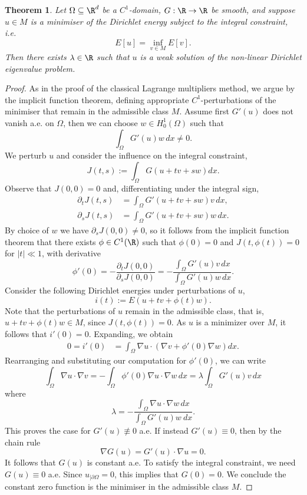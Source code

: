 \documentclass[reqno]{amsart}
\newtheorem{theorem}{Theorem}
\theoremstyle{definition}
\theoremstyle{remark}
\newcounter{problem}[section]	\declaretheorem[style=thmrecbox,name=Problem, numberlike=problem]{statement}
\begin{document}
\begin{theorem}
	Let $\Omega \subseteq \R^d$ be a $C^1$-domain, $G : \R \to \R$ be smooth, and suppose $u \in M$ is a minimiser of the Dirichlet energy subject to the integral constraint, i.e.
		\[ E[u] = \inf_{v \in M} E[v]. \] 
	Then there exists $\lambda \in \R$ such that $u$ is a weak solution of the non-linear Dirichlet eigenvalue problem. 
\end{theorem}	

\begin{proof}
	As in the proof of the classical Lagrange multipliers method, we argue by the implicit function theorem, defining appropriate $C^1$-perturbations of the minimiser that remain in the admissible class $M$. Assume first $G' (u)$ does not vanish a.e. on $\Omega$, then we can choose $w \in H_0^1 (\Omega)$ such that 
		\[ \int_\Omega G'(u) w \, dx \neq 0. \]
	We perturb $u$ and consider the influence on the integral constraint, 
		\[ J(t, s) := \int_\Omega G(u + t v + s w) dx. \]
	Observe that $J(0,0) = 0$ and, differentiating under the integral sign, 
		\begin{align*}
			\partial_t J(t, s) 
				&= \int_\Omega G'(u + t v + sw) v \, dx, \\
			\partial_s J(t, s)
				&= \int_\Omega G'(u + t v + s w) w \, dx.
		\end{align*}	
	By choice of $w$ we have $\partial_s J (0, 0) \neq 0$, so it follows from the implicit function theorem that there exists $\phi \in C^1 (\R)$ such that $\phi(0) = 0$ and $J(t, \phi(t)) = 0$ for $|t| \ll 1$, with derivative
		\[ \phi'(0) = -\frac{\partial_t J(0, 0)}{\partial_s J(0, 0)} = - \frac{\int_\Omega G'(u) v \, dx}{\int_\Omega G' (u) w\,  dx}. \]
	Consider the following Dirichlet energies under perturbations of $u$, 
		\[ i(t) := E(u + t v + \phi(t) w). \]	
	Note that the perturbations of $u$ remain in the admissible class, that is, $u + tv + \phi(t)w \in M$, since $J(t, \phi(t)) = 0$. As $u$ is a minimizer over $M$, it follows that $i'(0) = 0$. Expanding, we obtain 
		\begin{align*}
			0 = i'(0) 
				&= \int_\Omega \nabla u \cdot (\nabla v + \phi'(0) \nabla w) dx.
		\end{align*}		
	Rearranging and substituting our computation for $\phi' (0)$, we can write
		\[ \int_\Omega \nabla u \cdot \nabla v = - \int_\Omega \phi'(0) \nabla u \cdot \nabla w\, dx = \lambda \int_\Omega G'(u) v \, dx  \]
	where
		\[ \lambda = - \frac{\int_\Omega \nabla u \cdot \nabla w\, dx}{\int_\Omega G' (u) w\ dx}. \]						This proves the case for $G'(u) \not\equiv 0$ a.e. If instead $G'(u) \equiv 0$, then by the chain rule
		\[ \nabla G(u) = G'(u) \cdot \nabla u = 0. \]
	It follows that $G(u)$ is constant a.e. To satisfy the integral constraint, we need $G(u) \equiv 0$ a.e. Since $u_{|\partial \Omega} = 0$, this implies that $G(0) = 0$. We conclude the constant zero function is the minimiser in the admissible class $M$. 
\end{proof}
\end{document}
